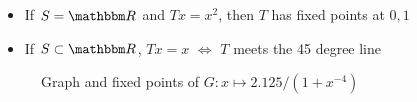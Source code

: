 \begin{frame}
    
    \Egs
    \begin{itemize}
        \item If $S = \RR$ and $Tx = x^2$, then $T$ has fixed points at $0, 1$
        \vspace{1em}
        \item If $S \subset \RR$,  $Tx =x$ $\iff$ $T$ meets the 45 degree line
    \end{itemize}


\end{frame}



\begin{frame}
    
    \begin{figure}
        \centering
        \caption{\label{f:three_fixed_points} 
            Graph and fixed points of $G \colon x \mapsto 2.125/(1 + x^{-4})$ }
    \end{figure}

\end{frame}


